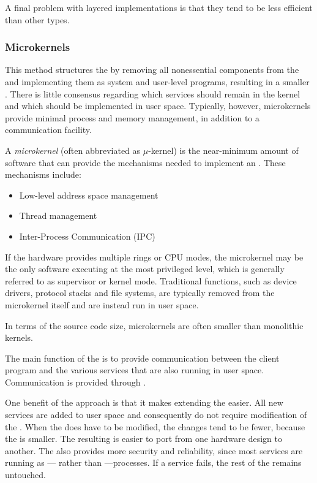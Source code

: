 A final problem with layered implementations is that they tend to be less efficient than other types.

\subsubsection{Microkernels}\label{subsubsec:Microkernels}
This method structures the  by removing all nonessential components from the  and implementing them as system and user-level programs, resulting in a smaller .
There is little consensus regarding which services should remain in the kernel and which should be implemented in user space.
Typically, however, microkernels provide minimal process and memory management, in addition to a communication facility.

\begin{definition}[Microkernel]\label{def:Microkernel}
  A \emph{microkernel} (often abbreviated as $\mu$-kernel) is the near-minimum amount of software that can provide the mechanisms needed to implement an .
  These mechanisms include:
  \begin{itemize}[noitemsep]
  \item Low-level address space management
  \item Thread management
  \item Inter-Process Communication (IPC)
  \end{itemize}

  If the hardware provides multiple rings or CPU modes, the microkernel may be the only software executing at the most privileged level, which is generally referred to as supervisor or kernel mode.
  Traditional  functions, such as device drivers, protocol stacks and file systems, are typically removed from the microkernel itself and are instead run in user space.

  In terms of the source code size, microkernels are often smaller than monolithic kernels.
\end{definition}

The main function of the  is to provide communication between the client program and the various services that are also running in user space.
Communication is provided through .

One benefit of the  approach is that it makes extending the  easier.
All new services are added to user space and consequently do not require modification of the .
When the  does have to be modified, the changes tend to be fewer, because the  is smaller.
The resulting  is easier to port from one hardware design to another.
The  also provides more security and reliability, since most services are running as — rather than —processes.
If a service fails, the rest of the  remains untouched.

